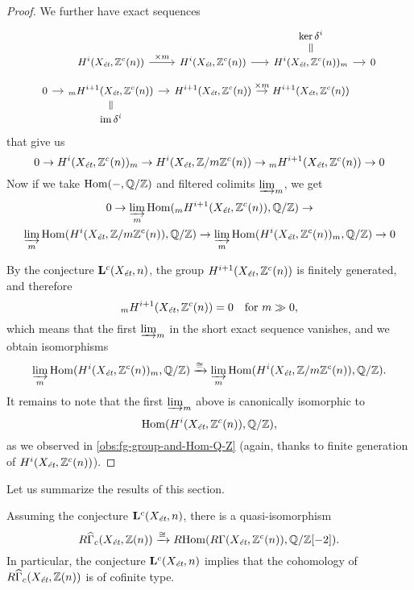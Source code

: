 \begin{proof}
  We further have exact sequences
  \[ \begin{tikzcd}[row sep=0.8em,column sep=1em,font=\small]
      & & & \ker \delta^i\ar[equal]{d} \\
      & H^i (X_\text{\it ét}, \ZZ^c (n)) \ar{r}{\times m} & H^i (X_\text{\it ét}, \ZZ^c (n))\ar{r} & H^i (X_\text{\it ét}, \ZZ^c (n))_m \ar{r} & 0 \\
      0\ar{r} & {}_m H^{i+1} (X_\text{\it ét}, \ZZ^c (n)) \ar{r} & H^{i+1} (X_\text{\it ét}, \ZZ^c (n))\ar{r}{\times m} & H^{i+1} (X_\text{\it ét}, \ZZ^c (n)) \\
      & \im \delta^i\ar[equal]{u}
    \end{tikzcd} \]
  that give us
  \[ 0 \to H^i (X_\text{\it ét}, \mathbb{Z}^c (n))_m \to
    H^i (X_\text{\it ét}, \mathbb{Z}/m\mathbb{Z}^c (n)) \to
    {}_m H^{i+1} (X_\text{\it ét}, \mathbb{Z}^c (n)) \to 0 \]
  Now if we take $\operatorname{Hom} (-,\mathbb{Q}/\mathbb{Z})$ and filtered colimits $\varinjlim_m$, we get
  \begin{multline}
    \label{eqn:short-exact-sequence-with-dirlim}
    0 \to \varinjlim_m \operatorname{Hom} ({}_m H^{i+1} (X_\text{\it ét}, \mathbb{Z}^c (n)), \mathbb{Q}/\mathbb{Z}) \to \\
    \varinjlim_m \operatorname{Hom} (H^i (X_\text{\it ét}, \mathbb{Z}/m\mathbb{Z}^c (n)), \mathbb{Q}/\mathbb{Z}) \to
    \varinjlim_m \operatorname{Hom} (H^i (X_\text{\it ét}, \mathbb{Z}^c (n))_m, \mathbb{Q}/\mathbb{Z}) \to 0
  \end{multline}

  By the conjecture $\mathbf{L}^c (X_\text{\it ét}, n)$, the group
  $H^{i+1} (X_\text{\it ét}, \mathbb{Z}^c (n))$ is finitely generated, and therefore
  $${}_m H^{i+1} (X_\text{\it ét}, \mathbb{Z}^c (n)) = 0 \quad \text{for } m \gg 0,$$
  which means that the first $\varinjlim_m$ in the short exact sequence
   vanishes, and we obtain
  isomorphisms
  \[ \varinjlim_m \operatorname{Hom} (H^i (X_\text{\it ét}, \mathbb{Z}^c (n))_m, \mathbb{Q}/\mathbb{Z}) \xrightarrow{\cong}
    \varinjlim_m \operatorname{Hom} (H^i (X_\text{\it ét}, \mathbb{Z}/m\mathbb{Z}^c (n)), \mathbb{Q}/\mathbb{Z}). \]
  It remains to note that the first $\varinjlim_m$ above is canonically isomorphic
  to
  $$\operatorname{Hom} (H^i (X_\text{\it ét}, \mathbb{Z}^c (n)), \mathbb{Q}/\mathbb{Z}),$$
  as we observed in \ref{obs:fg-group-and-Hom-Q-Z}
  (again, thanks to finite generation of $H^i (X_\text{\it ét}, \mathbb{Z}^c (n))$).
\end{proof}

Let us summarize the results of this section.

\begin{theorem}
  \label{thm:artin-verdier-duality}
  Assuming the conjecture $\mathbf{L}^c (X_\text{\it ét}, n)$, there is a
  quasi-isomorphism
  \[ R\widehat{\Gamma}_c (X_\text{\it ét}, \mathbb{Z} (n)) \xrightarrow{\cong}
    R\!\operatorname{Hom} (R\Gamma (X_\text{\it ét}, \mathbb{Z}^c (n)), \mathbb{Q}/\mathbb{Z} [-2]). \]
  In particular, the conjecture $\mathbf{L}^c (X_\text{\it ét}, n)$ implies that
  the cohomology of $R\widehat{\Gamma}_c (X_\text{\it ét}, \mathbb{Z} (n))$ is of
  cofinite type.
\end{theorem}


